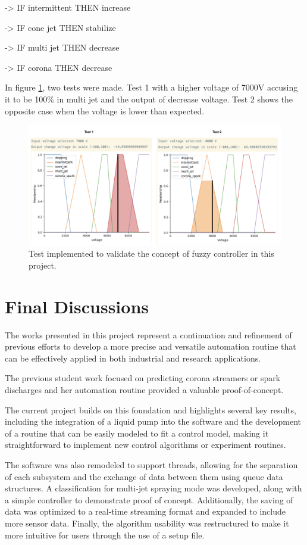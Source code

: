         -> IF intermittent THEN increase

        -> IF cone jet THEN stabilize

        -> IF multi jet THEN decrease

        -> IF corona THEN decrease


        In figure \ref{fig:fuzzyy1}, two tests were made. Test 1 with a higher voltage of 7000V accusing it to be 100\% in multi jet and the output of decrease voltage. Test 2 shows the opposite case when the voltage is lower than expected.

    \begin{figure}[H]
        \centering
        \includegraphics[width=17cm]{Figuras/fuzzy/test3.png}
        \caption{Test implemented to validate the concept of fuzzy controller in this project.}
        \label{fig:fuzzyy1}
    \end{figure}
        

    \section{Final Discussions}

        The works presented in this project represent a continuation and refinement of previous efforts to develop a more precise and versatile automation routine that can be effectively applied in both industrial and research applications. 
        
        The previous student work focused on predicting corona streamers or spark discharges\cite{Monica} and her automation routine provided a valuable proof-of-concept. 
        
        The current project builds on this foundation and highlights several key results, including the integration of a liquid pump into the software and the development of a routine that can be easily modeled to fit a control model, making it straightforward to implement new control algorithms or experiment routines. 
        
        The software was also remodeled to support threads, allowing for the separation of each subsystem and the exchange of data between them using queue data structures. A classification for multi-jet spraying mode was developed, along with a simple controller to demonstrate proof of concept. 
        Additionally, the saving of data was optimized to a real-time streaming format and expanded to include more sensor data. Finally, the algorithm usability was restructured to make it more intuitive for users through the use of a setup file.

        
\clearpage
